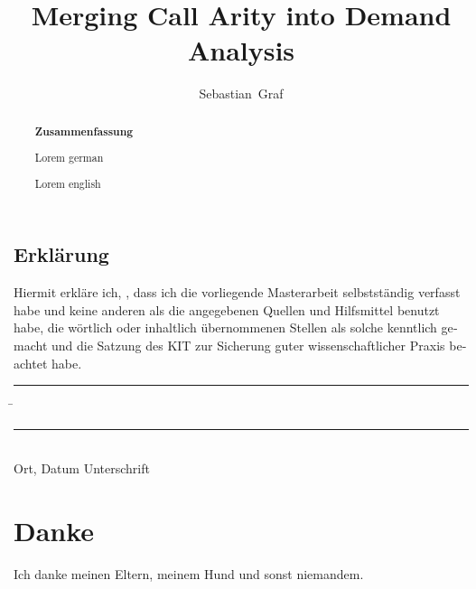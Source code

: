 \documentclass[12pt,a4paper,twoside,headings=openright]{scrreprt}
\title{Merging Call Arity into Demand Analysis}
\author{Sebastian~Graf}
\begin{document}
\begin{otherlanguage}{ngerman} %
\mytitlepage
\end{otherlanguage}

\begin{abstract}
\begin{center}\Huge\textbf{\textsf{Zusammenfassung}}
\end{center}
\vfill

Lorem german
\vfill

Lorem english
\vfill

\end{abstract}

\tableofcontents









\printbibliography

\begin{otherlanguage}{ngerman}
\chapter*{Erklärung}
\pagestyle{empty}

  \vspace{20mm}
  Hiermit erkläre ich, \theauthor, dass ich die vorliegende Masterarbeit selbst\-ständig
verfasst habe und keine anderen als die angegebenen Quellen und Hilfsmittel
benutzt habe, die wörtlich oder inhaltlich übernommenen Stellen als solche kenntlich gemacht und
die Satzung des KIT zur Sicherung guter wissenschaftlicher Praxis beachtet habe.
  \vspace{20mm}
  \begin{tabbing}
  \rule{4cm}{.4pt}\hspace{1cm} \= \rule{7cm}{.4pt} \\
 Ort, Datum \> Unterschrift
  \end{tabbing}
\end{otherlanguage}

\chapter*{Danke}
\pagestyle{empty}

Ich danke meinen Eltern, meinem Hund und sonst niemandem.

\pagestyle{fancy}
\appendix

%
\end{document}
